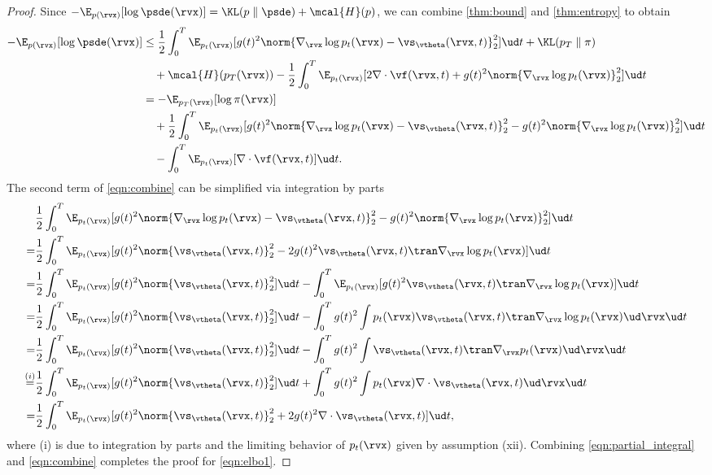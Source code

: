 \begin{proof}
Since $-\E_{p(\rvx)}[\log \psde(\rvx)] = \KL(p\mathrel\| \psde) + \mcal{H}(p)$, we can combine \cref{thm:bound} and \cref{thm:entropy} to obtain
\begin{align}
-\E_{p(\rvx)}[\log \psde(\rvx)] &\leq \frac{1}{2}\int_0^T \E_{p_t(\rvx)}[g(t)^2\norm{\nabla_\rvx \log p_t(\rvx) - \vs_\vtheta(\rvx, t)}_2^2]\ud t + \KL(p_T\mathrel\| \pi) \notag \\
 & \quad + \mcal{H}(p_T(\rvx)) - \frac{1}{2}\int_0^T \E_{p_t(\rvx)}[2 \nabla\cdot \vf(\rvx, t) + g(t)^2 \norm{\nabla_\rvx \log p_t(\rvx)}_2^2]\ud t \notag \\
 &= -\E_{p_T(\rvx)}[\log \pi(\rvx)] \notag \\
 &\quad + \frac{1}{2}\int_0^T \E_{p_t(\rvx)}[g(t)^2\norm{\nabla_\rvx \log p_t(\rvx) - \vs_\vtheta(\rvx, t)}_2^2 - g(t)^2 \norm{\nabla_\rvx \log p_t(\rvx)}_2^2]\ud t \notag \\
 &\quad - \int_0^T \E_{p_t(\rvx)}[\nabla \cdot \vf(\rvx, t)]\ud t.\label{eqn:combine}
\end{align}
The second term of \cref{eqn:combine} can be simplified via integration by parts
\begin{align}
    & \frac{1}{2}\int_0^T \E_{p_t(\rvx)}[g(t)^2\norm{\nabla_\rvx \log p_t(\rvx) - \vs_\vtheta(\rvx, t)}_2^2 - g(t)^2 \norm{\nabla_\rvx \log p_t(\rvx)}_2^2]\ud t \notag \\
    =& \frac{1}{2}\int_0^T \E_{p_t(\rvx)}[g(t)^2 \norm{\vs_\vtheta(\rvx, t)}_2^2 - 2 g(t)^2 \vs_\vtheta(\rvx,t)\tran \nabla_\rvx \log p_t(\rvx)] \ud t \notag \\
    =& \frac{1}{2}\int_0^T \E_{p_t(\rvx)}[g(t)^2 \norm{\vs_\vtheta(\rvx, t)}_2^2]\ud t
    - \int_0^T \E_{p_t(\rvx)}[g(t)^2 \vs_\vtheta(\rvx,t)\tran \nabla_\rvx \log p_t(\rvx)] \ud t \notag \\
    =& \frac{1}{2}\int_0^T \E_{p_t(\rvx)}[g(t)^2 \norm{\vs_\vtheta(\rvx, t)}_2^2]\ud t
    - \int_0^T g(t)^2 \int p_t(\rvx) \vs_\vtheta(\rvx,t)\tran \nabla_\rvx \log p_t(\rvx) \ud \rvx \ud t \notag \\
    =& \frac{1}{2}\int_0^T \E_{p_t(\rvx)}[g(t)^2 \norm{\vs_\vtheta(\rvx, t)}_2^2]\ud t
    - \int_0^T g(t)^2 \int \vs_\vtheta(\rvx,t)\tran \nabla_\rvx p_t(\rvx) \ud \rvx \ud t \notag \\
    \stackrel{(i)}{=}& \frac{1}{2}\int_0^T \E_{p_t(\rvx)}[g(t)^2 \norm{\vs_\vtheta(\rvx, t)}_2^2]\ud t
    + \int_0^T g(t)^2 \int p_t(\rvx) \nabla \cdot \vs_\vtheta(\rvx, t) \ud \rvx \ud t \notag \\
    =& \frac{1}{2}\int_0^T \E_{p_t(\rvx)}[g(t)^2 \norm{\vs_\vtheta(\rvx, t)}_2^2 + 2g(t)^2 \nabla \cdot \vs_\vtheta(\rvx, t)]\ud t, \label{eqn:partial_integral}
\end{align}
where (i) is due to integration by parts and the limiting behavior of $p_t(\rvx)$ given by assumption (xii). Combining \cref{eqn:partial_integral} and \cref{eqn:combine} completes the proof for \cref{eqn:elbo1}.


\end{proof}
